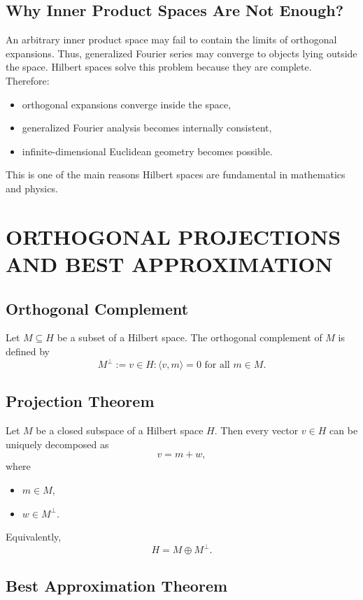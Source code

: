 \documentclass[aps,prl,twocolumn,groupedaddress]{revtex4-2}
\begin{document}
\subsection{Why Inner Product Spaces Are Not Enough?}

An arbitrary inner product space may fail to contain the limits of orthogonal expansions.
Thus, generalized Fourier series may converge to objects lying outside the space.
Hilbert spaces solve this problem because they are complete.
Therefore:
\begin{itemize}
\item orthogonal expansions converge inside the space,
\item generalized Fourier analysis becomes internally consistent,
\item infinite-dimensional Euclidean geometry becomes possible.
\end{itemize}
This is one of the main reasons Hilbert spaces are fundamental in mathematics and physics.

\section{ORTHOGONAL PROJECTIONS AND BEST APPROXIMATION}

\subsection{Orthogonal Complement}

Let $M\subseteq H$ be a subset of a Hilbert space.
The orthogonal complement of $M$ is defined by
$$
M^\perp
:=
{
v\in H:
\langle v,m\rangle=0
\text{ for all }m\in M
}.
$$

\subsection{Projection Theorem}

Let $M$ be a closed subspace of a Hilbert space $H$.
Then every vector $v\in H$ can be uniquely decomposed as
$$
v=m+w,
$$
where
\begin{itemize}
\item $m\in M$,
\item $w\in M^\perp$.
\end{itemize}
Equivalently,
$$
H=M\oplus M^\perp.
$$

\subsection{Best Approximation Theorem}
\end{document}
